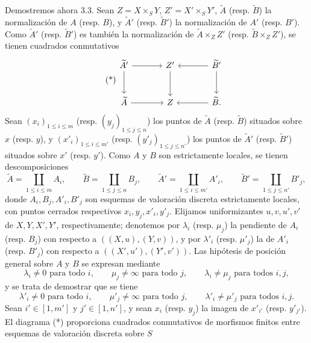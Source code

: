 Demostremos ahora 3.3. Sean $Z=X\times_SY$, $Z'=X'\times_SY'$, $\widetilde A$ (resp. $\widetilde B$) la normalización de $A$ (resp. $B$), y $\widetilde A'$ (resp. $\widetilde B'$) la normalización de $A'$ (resp. $B'$). Como $\widetilde A'$ (resp. $\widetilde B'$) es también la normalización de $\widetilde A\times_ZZ'$ (resp. $\widetilde B\times_ZZ'$), se tienen cuadrados conmutativos
\begin{equation}
\tag{*}
\begin{tikzcd}[column sep=large,row sep=large]
\widetilde A' \arrow[r] \arrow[d] & Z' \arrow[d] & \widetilde B' \arrow[l] \arrow[d]\\
\widetilde A \arrow[r] & Z & \widetilde B . \arrow[l]
\end{tikzcd}
\end{equation}
Sean $(x_i)_{1\le i\le m}$ (resp. $(y_j)_{1\le j\le n}$) los puntos de $\widetilde A$ (resp. $\widetilde B$) situados sobre $x$ (resp. $y$), y $(x'_i)_{1\le i\le m'}$ (resp. $(y'_j)_{1\le j\le n'}$) los puntos de $\widetilde A'$ (resp. $\widetilde B'$) situados sobre $x'$ (resp. $y'$). Como $A$ y $B$ son estrictamente locales, se tienen descomposiciones
\[
\widetilde A=\coprod_{1\le i\le m}A_i,\qquad
\widetilde B=\coprod_{1\le j\le n}B_j,\qquad
\widetilde A'=\coprod_{1\le i\le m'}A'_i,\qquad
\widetilde B'=\coprod_{1\le j\le n'}B'_j,
\]
donde $A_i,B_j,A'_i,B'_j$ son esquemas de valoración discreta estrictamente locales, con puntos cerrados respectivos $x_i,y_j,x'_i,y'_j$. Elijamos uniformizantes $u,v,u',v'$ de $X,Y,X',Y'$, respectivamente; denotemos por $\lambda_i$ (resp. $\mu_j$) la pendiente de $A_i$ (resp. $B_j$) con respecto a $((X,u),(Y,v))$, y por $\lambda'_i$ (resp. $\mu'_j$) la de $A'_i$ (resp. $B'_j$) con respecto a $((X',u'),(Y',v'))$. Las hipótesis de posición general sobre $A$ y $B$ se expresan mediante
\begin{equation}
\lambda_i\ne0\text{ para todo }i,\qquad
\mu_j\ne\infty\text{ para todo }j,\qquad
\lambda_i\ne\mu_j\text{ para todos }i,j,
\tag{1}
\end{equation}
y se trata de demostrar que se tiene
\begin{equation}
\lambda'_i\ne0\text{ para todo }i,\qquad
\mu'_j\ne\infty\text{ para todo }j,\qquad
\lambda'_i\ne\mu'_j\text{ para todos }i,j.
\tag{2}
\end{equation}
Sean $i'\in[1,m']$ y $j'\in[1,n']$, y sean $x_i$ (resp. $y_j$) la imagen de $x'_{i'}$ (resp. $y'_{j'}$). El diagrama (*) proporciona cuadrados conmutativos de morfismos finitos entre esquemas de valoración discreta sobre $S$
